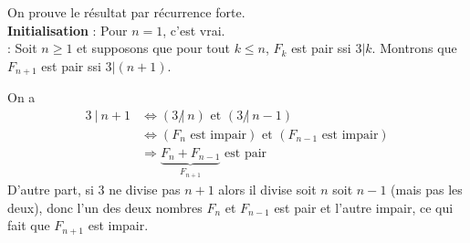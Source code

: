 \begin{Soln}{49}
On prouve le résultat par récurrence forte.\\
\textbf{Initialisation} : Pour $n=1$, c'est vrai.\\
 : Soit $n\geq 1$ et supposons que pour tout $k\leq n$,  $F_k$ est pair ssi $3|k$. Montrons que $F_{n+1}$ est pair ssi $3|(n+1)$.\\

On a
\begin{align*}
3~|~n+1
&\Leftrightarrow  (3~\not|~n)\text{ et } (3~\not|~n-1)\\
&\Leftrightarrow (F_n \text{ est impair}) \text{ et } (F_{n-1} \text{ est impair})\\
&\Rightarrow \underbrace{F_n+F_{n-1}}_{F_{n+1}} \text{ est pair}
\end{align*}
D'autre part, si $3$ ne divise pas $n+1$ alors il divise soit $n$ soit $n-1$ (mais pas les deux), donc l'un des deux nombres $F_n$ et $F_{n-1}$ est pair et l'autre impair, ce qui fait que $F_{n+1}$ est impair.

\end{Soln}
